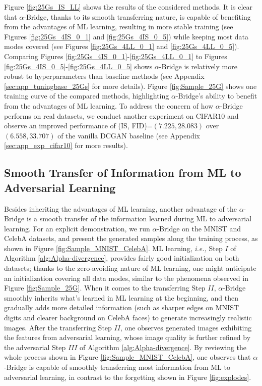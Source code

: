 \documentclass[letterpaper]{article} %
\newcommand{\ie}[0]{\emph{i.e., }}
\begin{document}
Figure \ref{fig:25Gs_IS_LL} shows the results of the considered methods. 
It is clear that $\alpha$-Bridge, thanks to its smooth transferring nature, is capable of benefiting from the advantages of ML learning, resulting in more stable training (see Figures \ref{fig:25Gs_4IS_0_1} and \ref{fig:25Gs_4IS_0_5}) while keeping most data modes covered (see Figures \ref{fig:25Gs_4LL_0_1} and \ref{fig:25Gs_4LL_0_5}). 
Comparing Figures \ref{fig:25Gs_4IS_0_1}-\ref{fig:25Gs_4LL_0_1} to Figures \ref{fig:25Gs_4IS_0_5}-\ref{fig:25Gs_4LL_0_5} shows $\alpha$-Bridge is relatively more robust to hyperparameters than baseline methods (see 
Appendix \ref{sec:app_tuningbase_25Gs} 
for more details). 
Figure \ref{fig:Sample_25G} shows one training curve of the compared methods, highlighting $\alpha$-Bridge's ability to benefit from the advantages of ML learning.
To address the concern of how $\alpha$-Bridge performs on real datasets, we conduct another experiment on CIFAR$10$ \cite{krizhevsky2009learning}
and observe an improved performance of (IS, FID\cite{heusel2017gans})=$(7.225, 28.083)$ over $(6.558, 33.707)$ of the vanilla DCGAN baseline (see 
Appendix \ref{sec:app_exp_cifar10}
for more results).


\subsection{Smooth Transfer of Information from ML to Adversarial Learning}

Besides inheriting the advantages of ML learning, another advantage of the $\alpha$-Bridge is a smooth transfer of the information learned during ML to adversarial learning.
For an explicit demonstration, we run $\alpha$-Bridge on the MNIST \cite{lecun1998gradient} and CelebA \cite{liu2015deep} datasets, and present the generated samples along the training process, as shown in Figure \ref{fig:Sample_MNIST_CelebA}. 
ML learning, \ie Step $I$ of Algorithm \ref{alg:Alpha-divergence}, provides fairly good initialization on both datasets; thanks to the zero-avoiding nature of ML learning, one might anticipate an initialization covering all data modes, similar to the phenomena observed in Figure \ref{fig:Sample_25G}.
When it comes to the transferring Step $I\!I$, $\alpha$-Bridge smoothly inherits what's learned in ML learning at the beginning, and then gradually adds more detailed information (such as sharper edges on MNIST digits and clearer background on CelebA faces) to generate increasingly realistic images.
After the transferring Step $I\!I$, one observes generated images exhibiting the features from adversarial learning, whose image quality is further refined by the adversarial Step $I\!I\!I$ of Algorithm \ref{alg:Alpha-divergence}. 
By reviewing the whole process shown in Figure \ref{fig:Sample_MNIST_CelebA}, one observes that $\alpha$-Bridge is capable of smoothly transferring most information from ML to adversarial learning, in contrast to the forgetting shown in Figure \ref{fig:explodes}. 
\end{document}
